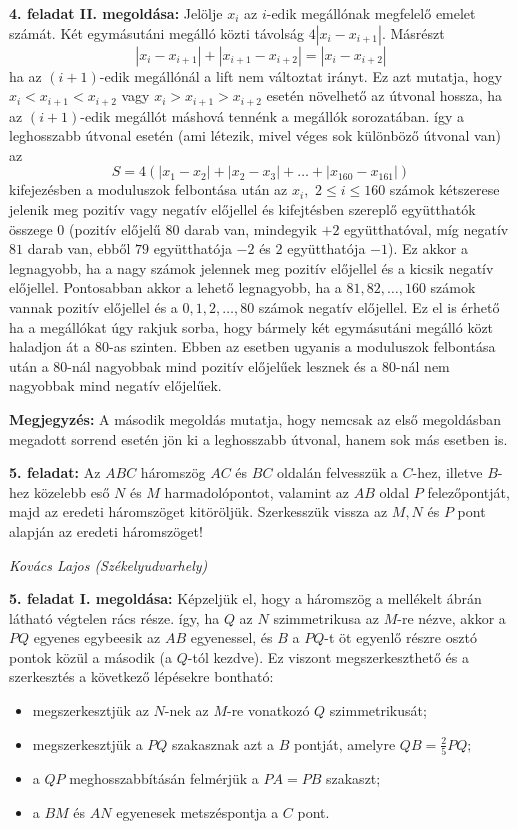 \documentclass[a4paper,10pt]{article}
\def\ki#1#2{\hfill {\it #1 (#2)}\medskip}
\begin{document}
{\bf 4. feladat II. megoldása: } Jelölje $x_i$ az $i$-edik
megállónak megfelelő eme\-let számát. Két
egymás\-utáni megálló közti távolság $4|x_i-x_{i+1}|.$
Másrészt
$$|x_i-x_{i+1}|+|x_{i+1}-x_{i+2}|=|x_{i}-x_{i+2}|$$ ha az
$(i+1)$-edik megállónál a lift nem változtat irányt. Ez
azt mutatja, hogy $x_i<x_{i+1}<x_{i+2}$ vagy $x_i>x_{i+1}>x_{i+2}$
ese\-tén növelhető az útvonal hossza, ha az $(i+1)$-edik
megállót máshová tennénk a megállók sorozatában.
így a leghosszabb útvonal esetén (ami létezik, mivel véges
sok különböző útvonal van) az
$$S=4\left(|x_1-x_2|+|x_2-x_3|+\ldots +|x_{160}-x_{161}|\right)$$
kifejezésben a moduluszok felbontása után az $x_i,$ $2\leq
i\leq 160$ számok kétszerese jelenik meg pozitív vagy
negatív előjellel és kifejtésben szereplő
együtthatók összege $0$ (pozitív előjelű $80$ da\-rab
van, mindegyik $+2$ együtthatóval, míg negatív $81$ darab van,
ebből $79$ együtthatója $-2$ és $2$ együtthatója $-1$).
Ez akkor a leg\-na\-gyobb, ha a nagy számok jelennek meg pozitív
előjellel és a ki\-csik negatív előjellel. Pontosabban
akkor a lehető leg\-na\-gyobb, ha a $81,82,\ldots ,160$ számok
vannak pozitív előjellel és a $0,1,2,\ldots, 80$ számok
negatív előjellel. Ez el is érhető ha a megállókat
úgy rakjuk sorba, hogy bármely két egymásutáni megálló
közt ha\-ladjon át a $80$-as szinten. Ebben az esetben ugyanis a
modu\-luszok felbontása után a $80$-nál nagyobbak mind
pozitív előjelűek lesznek és a $80$-nál nem nagyobbak
mind negatív előjelűek.

\medskip

\textbf{Megjegyzés: } A második megoldás mutatja, hogy nemcsak az első
megoldásban megadott sorrend esetén jön ki a leghosszabb
útvonal, hanem sok más esetben is.

\medskip
{\bf 5. feladat: } Az $ABC$ háromszög $AC$ és $BC$ oldalán felvesszük a
$C$-hez, illetve $B$-hez közelebb eső $N$ és $M$
harmadolópontot, valamint az $AB$ oldal $P$ felezőpontját,
majd az eredeti háromszöget kitöröljük. Szer\-kesszük
vissza az $M,N$ és $P$ pont alapján az eredeti háromszöget!

\ki{Kovács Lajos}{Székelyudvarhely}\medskip

{\bf 5. feladat I. megoldása: } Képzeljük el, hogy a háromszög a mellékelt ábrán lát\-ható vég\-telen
rács része. így, ha $Q$ az $N$ szimmetrikusa az $M$-re
nézve, akkor a $PQ$ egyenes egybeesik az $AB$ egyenessel, és $B$
a $PQ$-t öt egyenlő részre osztó pontok közül a
második (a $Q$-tól kezdve). Ez viszont megszerkeszthető és
a szerkesztés a következő lépésekre bontható:
\begin{itemize}\item megszerkesztjük az $N$-nek az $M$-re
vonatkozó $Q$ szimmet\-rikusát;
\item megszerkesztjük a $PQ$ szakasznak azt a $B$ pontját, amelyre $QB=\frac 25 PQ;$
\item a $QP$ meghosszabbításán felmérjük a $PA=PB$
szakaszt;
\item a $BM$ és $AN$ egyenesek metszéspontja a $C$ pont.
\end{itemize}
\end{document}
